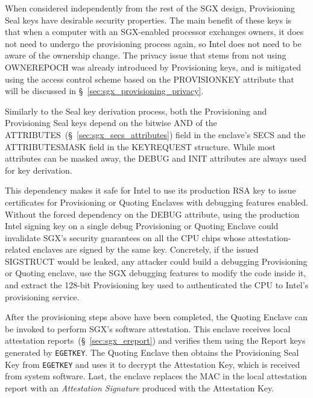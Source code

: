 When considered independently from the rest of the SGX design, Provisioning
Seal keys have desirable security properties. The main benefit of these keys is
that when a computer with an SGX-enabled processor exchanges owners, it does
not need to undergo the provisioning process again, so Intel does not need to
be aware of the ownership change. The privacy issue that stems from not using
OWNEREPOCH was already introduced by Provisioning keys, and is mitigated using
the access control scheme based on the PROVISIONKEY attribute that will be
discussed in \S~\ref{sec:sgx_provisioning_privacy}.

Similarly to the Seal key derivation process, both the Provisioning and
Provisioning Seal keys depend on the bitwise AND of the
ATTRIBUTES~(\S~\ref{sec:sgx_secs_attributes}) field in the enclave's SECS and
the ATTRIBUTESMASK field in the KEYREQUEST structure. While most attributes can
be masked away, the DEBUG and INIT attributes are always used for key
derivation.

This dependency makes it safe for Intel to use its production RSA key to issue
certificates for Provisioning or Quoting Enclaves with debugging features
enabled. Without the forced dependency on the DEBUG attribute, using the
production Intel signing key on a single debug Provisioning or Quoting Enclave
could invalidate SGX's security guarantees on all the CPU chips whose
attestation-related enclaves are signed by the same key.
Concretely, if the issued SIGSTRUCT would be leaked, any attacker could build a
debugging Provisioning or Quoting enclave, use the SGX debugging features to
modify the code inside it, and extract the 128-bit Provisioning key used to
authenticated the CPU to Intel's provisioning service.


After the provisioning steps above have been completed, the Quoting Enclave can
be invoked to perform SGX's software attestation. This enclave receives local
attestation reports~(\S~\ref{sec:sgx_ereport}) and verifies them using the
Report keys generated by \texttt{EGETKEY}. The Quoting Enclave then obtains the
Provisioning Seal Key from \texttt{EGETKEY} and uses it to decrypt the
Attestation Key, which is received from system software. Last, the enclave
replaces the MAC in the local attestation report with an \textit{Attestation
Signature} produced with the Attestation Key.


